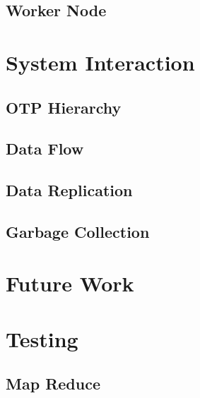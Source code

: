 \documentclass[a4paper,12pt]{article}
\begin{document}
\subsection{Worker Node}


\section{System Interaction}
\subsection{OTP Hierarchy}
\subsection{Data Flow}
\subsection{Data Replication}
\subsection{Garbage Collection}

\section{Future Work}

\section{Testing}
\subsection{Map Reduce}
\end{document}
